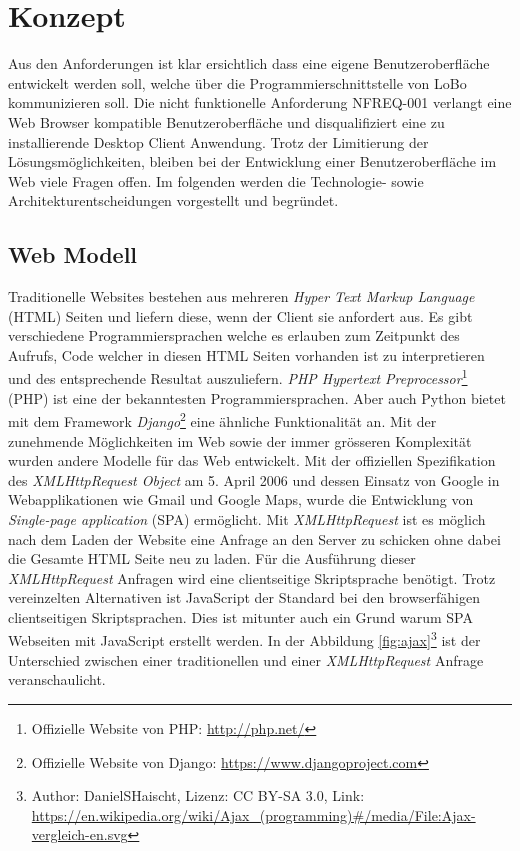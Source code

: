 \chapter{Konzept}
\label{sec:konzept}

Aus den Anforderungen ist klar ersichtlich dass eine eigene Benutzeroberfläche entwickelt werden soll, welche über die Programmierschnittstelle von LoBo kommunizieren soll. Die nicht funktionelle Anforderung NFREQ-001 verlangt eine Web Browser kompatible Benutzeroberfläche und disqualifiziert eine zu installierende Desktop Client Anwendung. Trotz der Limitierung der Lösungsmöglichkeiten, bleiben bei der Entwicklung einer Benutzeroberfläche im Web viele Fragen offen. Im folgenden werden die Technologie- sowie Architekturentscheidungen vorgestellt und begründet.

\section{Web Modell}
Traditionelle Websites bestehen aus mehreren \textit{Hyper Text Markup Language} (HTML) Seiten und liefern diese, wenn der Client sie anfordert aus. Es gibt verschiedene Programmiersprachen welche es erlauben zum Zeitpunkt des Aufrufs, Code welcher in diesen HTML Seiten vorhanden ist zu interpretieren und des entsprechende Resultat auszuliefern. \textit{PHP Hypertext Preprocessor}\footnote{Offizielle Website von PHP: \url{http://php.net/}} (PHP) ist eine der bekanntesten Programmiersprachen. Aber auch Python bietet mit dem Framework \textit{Django}\footnote{Offizielle Website von Django: \url{https://www.djangoproject.com}} eine ähnliche Funktionalität an. Mit der zunehmende Möglichkeiten im Web sowie der immer grösseren Komplexität wurden andere Modelle für das Web entwickelt. Mit der offiziellen Spezifikation des \textit{XMLHttpRequest Object} am 5. April 2006\citep[]{w3cXMLHttpRequest} und dessen Einsatz von Google in Webapplikationen wie Gmail und Google Maps, wurde die Entwicklung von \textit{Single-page application} (SPA) ermöglicht. Mit \textit{XMLHttpRequest} ist es möglich nach dem Laden der Website eine Anfrage an den Server zu schicken ohne dabei die Gesamte HTML Seite neu zu laden. Für die Ausführung dieser \textit{XMLHttpRequest} Anfragen wird eine clientseitige Skriptsprache benötigt. Trotz vereinzelten Alternativen ist JavaScript der Standard bei den browserfähigen clientseitigen Skriptsprachen. Dies ist mitunter auch ein Grund warum SPA Webseiten mit JavaScript erstellt werden. In der Abbildung \ref{fig:ajax}\footnote{Author: DanielSHaischt, Lizenz: CC BY-SA 3.0, Link: \url{https://en.wikipedia.org/wiki/Ajax_(programming)#/media/File:Ajax-vergleich-en.svg}} ist der Unterschied zwischen einer traditionellen und einer \textit{XMLHttpRequest} Anfrage veranschaulicht.

